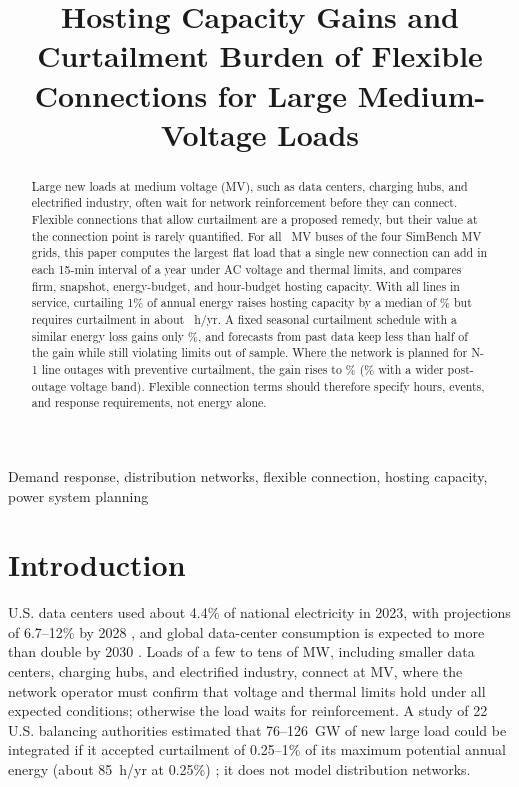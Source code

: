 \documentclass[conference,letterpaper]{IEEEtran}
\begin{document}
\title{Hosting Capacity Gains and Curtailment Burden of Flexible Connections for Large Medium-Voltage Loads}

\author{
}

\maketitle

\begin{abstract}
Large new loads at medium voltage (MV), such as data centers, charging hubs, and electrified industry, often wait for network reinforcement before they can connect. Flexible connections that allow curtailment are a proposed remedy, but their value at the connection point is rarely quantified. For all \nBus~MV buses of the four SimBench MV grids, this paper computes the largest flat load that a single new connection can add in each 15-min interval of a year under AC voltage and thermal limits, and compares firm, snapshot, energy-budget, and hour-budget hosting capacity. With all lines in service, curtailing 1\% of annual energy raises hosting capacity by a median of \poolGcmed\% but requires curtailment in about \poolGchrs~h/yr. A fixed seasonal curtailment schedule with a similar energy loss gains only \todWingain\%, and forecasts from past data keep less than half of the gain while still violating limits out of sample. Where the network is planned for N-1 line outages with preventive curtailment, the gain rises to \sensNmogO\% (\sensNmowgO\% with a wider post-outage voltage band). Flexible connection terms should therefore specify hours, events, and response requirements, not energy alone.
\end{abstract}

\begin{IEEEkeywords}
Demand response, distribution networks, flexible connection, hosting capacity, power system planning
\end{IEEEkeywords}

\section{Introduction}
U.S. data centers used about 4.4\% of national electricity in 2023, with projections of 6.7--12\% by 2028 \cite{lbnl}, and global data-center consumption is expected to more than double by 2030 \cite{iea}. Loads of a few to tens of MW, including smaller data centers, charging hubs, and electrified industry, connect at MV, where the network operator must confirm that voltage and thermal limits hold under all expected conditions; otherwise the load waits for reinforcement. A study of 22 U.S. balancing authorities estimated that 76--126~GW of new large load could be integrated if it accepted curtailment of 0.25--1\% of its maximum potential annual energy (about 85~h/yr at 0.25\%) \cite{duke,utilitydive2025}; it does not model distribution networks.
\end{document}
